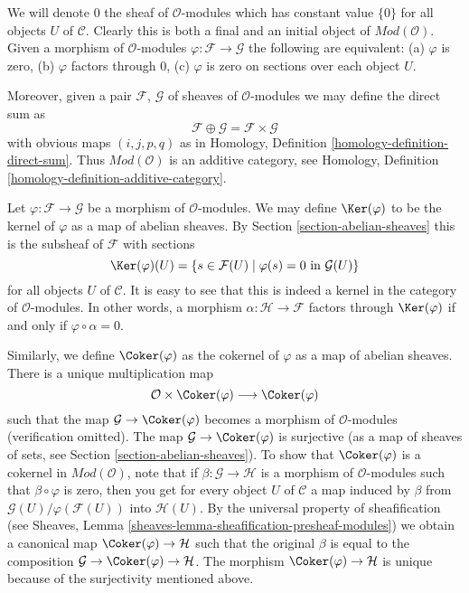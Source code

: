 \medskip\noindent
We will denote $0$ the sheaf of $\mathcal{O}$-modules
which has constant value $\{0\}$ for all objects $U$ of $\mathcal{C}$.
Clearly this is both a final and an initial object of
$\textit{Mod}(\mathcal{O})$. Given a morphism
of $\mathcal{O}$-modules $\varphi : \mathcal{F} \to \mathcal{G}$
the following are equivalent:
(a) $\varphi$ is zero, (b) $\varphi$ factors through $0$,
(c) $\varphi$ is zero on sections over each object $U$.

\medskip\noindent
Moreover, given a pair
$\mathcal{F}$, $\mathcal{G}$ of sheaves of $\mathcal{O}$-modules
we may define the direct sum as
$$
\mathcal{F} \oplus \mathcal{G} = \mathcal{F} \times \mathcal{G}
$$
with obvious maps $(i, j, p, q)$ as in Homology, Definition
\ref{homology-definition-direct-sum}. Thus $\textit{Mod}(\mathcal{O})$
is an additive category, see
Homology, Definition \ref{homology-definition-additive-category}.

\medskip\noindent
Let $\varphi : \mathcal{F} \to \mathcal{G}$ be a morphism
of $\mathcal{O}$-modules. We may define $\Ker(\varphi)$
to be the kernel of $\varphi$ as a map of abelian sheaves.
By Section \ref{section-abelian-sheaves} this is the
subsheaf of $\mathcal{F}$ with sections
$$
\Ker(\varphi)(U) =
\{ s \in \mathcal{F}(U) \mid \varphi(s) = 0 \text{ in } \mathcal{G}(U)\}
$$
for all objects $U$ of $\mathcal{C}$. It is easy to see that this is indeed
a kernel in the category of $\mathcal{O}$-modules. In other words,
a morphism $\alpha : \mathcal{H} \to \mathcal{F}$ factors
through $\Ker(\varphi)$ if and only if $\varphi \circ \alpha = 0$.

\medskip\noindent
Similarly, we define $\Coker(\varphi)$ as the cokernel of
$\varphi$ as a map of abelian sheaves. There is a unique
multiplication map
$$
\mathcal{O} \times \Coker(\varphi) \longrightarrow \Coker(\varphi)
$$
such that the map $\mathcal{G} \to \Coker(\varphi)$ becomes a
morphism of $\mathcal{O}$-modules (verification omitted).
The map $\mathcal{G} \to \Coker(\varphi)$ is surjective
(as a map of sheaves of sets, see Section \ref{section-abelian-sheaves}).
To show that $\Coker(\varphi)$ is a cokernel in
$\textit{Mod}(\mathcal{O})$, note that if
$\beta : \mathcal{G} \to \mathcal{H}$ is a morphism of $\mathcal{O}$-modules
such that $\beta \circ \varphi$ is zero, then you get for every
object $U$ of $\mathcal{C}$ a map induced by $\beta$ from
$\mathcal{G}(U)/\varphi(\mathcal{F}(U))$ into $\mathcal{H}(U)$.
By the universal property of sheafification (see
Sheaves, Lemma \ref{sheaves-lemma-sheafification-presheaf-modules})
we obtain a canonical map $\Coker(\varphi) \to \mathcal{H}$
such that the original $\beta$ is equal to the composition
$\mathcal{G} \to \Coker(\varphi) \to \mathcal{H}$.
The morphism $\Coker(\varphi) \to \mathcal{H}$ is unique
because of the surjectivity mentioned above.

